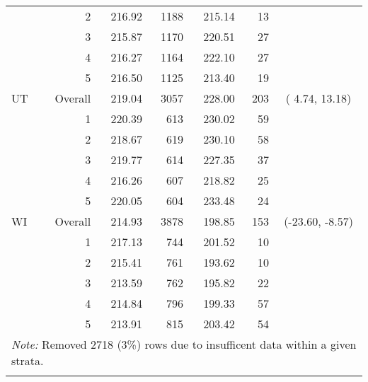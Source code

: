 \begin{longtable}{lrrr@{\extracolsep{.25cm}}rrc}
   & 2 & 216.92 & 1188 & 215.14 &  13 &  \\ 
   & 3 & 215.87 & 1170 & 220.51 &  27 &  \\ 
   & 4 & 216.27 & 1164 & 222.10 &  27 &  \\ 
   & 5 & 216.50 & 1125 & 213.40 &  19 &  \\ 
   \hline
UT & Overall & 219.04 & 3057 & 228.00 & 203 & (  4.74,  13.18) \\ 
   & 1 & 220.39 & 613 & 230.02 &  59 &  \\ 
   & 2 & 218.67 & 619 & 230.10 &  58 &  \\ 
   & 3 & 219.77 & 614 & 227.35 &  37 &  \\ 
   & 4 & 216.26 & 607 & 218.82 &  25 &  \\ 
   & 5 & 220.05 & 604 & 233.48 &  24 &  \\ 
   \hline
WI & Overall & 214.93 & 3878 & 198.85 & 153 & (-23.60,  -8.57) \\ 
   & 1 & 217.13 & 744 & 201.52 &  10 &  \\ 
   & 2 & 215.41 & 761 & 193.62 &  10 &  \\ 
   & 3 & 213.59 & 762 & 195.82 &  22 &  \\ 
   & 4 & 214.84 & 796 & 199.33 &  57 &  \\ 
   & 5 & 213.91 & 815 & 203.42 &  54 &  \\ 
   \hline \multicolumn{7}{l}{\textit{Note:} Removed 2718 (3\%) rows due to insufficent data within a given strata.} \\\hline
\label{g4read-mlpsa-lr}
\end{longtable}
